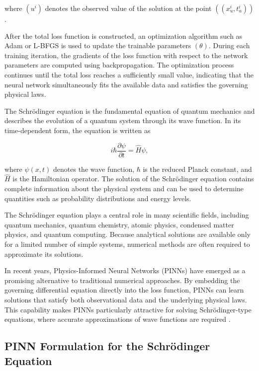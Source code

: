 \documentclass[11pt]{article}
\begin{document}
where $(u^i)$ denotes the observed value of the solution at the point $((x_u^i,t_u^i))$.


After the total loss function is constructed, an optimization algorithm such 
as Adam or L-BFGS is used to update the trainable parameters $(\theta)$. 
During each training iteration, the gradients of the loss function with 
respect to the network parameters are computed using backpropagation. 
The optimization process continues until the total loss reaches a sufficiently 
small value, indicating that the neural network simultaneously fits the available 
data and satisfies the governing physical laws.


The Schrödinger equation is the fundamental equation of quantum mechanics and 
describes the evolution of a quantum system through its wave function. In its 
time-dependent form, the equation is written as

\begin{equation}
i\hbar \frac{\partial \psi}{\partial t}
=
\hat{H}\psi,
\end{equation}

where $\psi(x,t)$ denotes the wave function, $\hbar$ is the reduced 
Planck constant, and $\hat{H}$ is the Hamiltonian operator. 
The solution of the Schrödinger equation contains complete 
information about the physical system and can be used to 
determine quantities such as probability distributions and energy levels.

The Schrödinger equation plays a central role in many 
scientific fields, including quantum mechanics, 
quantum chemistry, atomic physics, 
condensed matter physics, and quantum computing. 
Because analytical solutions are available only for a 
limited number of simple systems, numerical methods are 
often required to approximate its solutions.

In recent years, Physics-Informed Neural Networks (PINNs) 
have emerged as a promising alternative to traditional numerical 
approaches. By embedding the governing differential 
equation directly into the loss function, PINNs can learn 
solutions that satisfy both observational data and the 
underlying physical laws. This capability makes PINNs particularly
attractive for solving Schrödinger-type equations, where accurate 
approximations of wave functions are required \cite{wangDatadrivenRogueWaves2021}. 

\subsection{PINN Formulation for the Schrödinger Equation}
\end{document}
